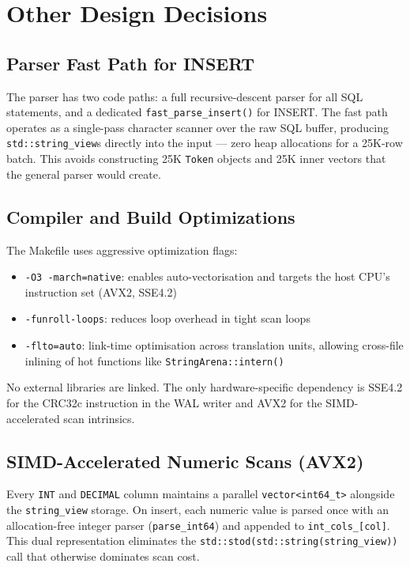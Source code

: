 \documentclass[12pt,a4paper]{article}
\begin{document}
\section{Other Design Decisions}

\subsection{Parser Fast Path for INSERT}

The parser has two code paths: a full recursive-descent parser for all SQL statements,
and a dedicated \texttt{fast\_parse\_insert()} for INSERT. The fast path operates as a
single-pass character scanner over the raw SQL buffer, producing
\texttt{std::string\_view}s directly into the input --- zero heap allocations for a 25K-row
batch. This avoids constructing 25K \texttt{Token} objects and 25K inner vectors that
the general parser would create.

\subsection{Compiler and Build Optimizations}

The Makefile uses aggressive optimization flags:

\begin{itemize}[noitemsep]
  \item \texttt{-O3 -march=native}: enables auto-vectorisation and targets the host CPU's
        instruction set (AVX2, SSE4.2)
  \item \texttt{-funroll-loops}: reduces loop overhead in tight scan loops
  \item \texttt{-flto=auto}: link-time optimisation across translation units, allowing
        cross-file inlining of hot functions like \texttt{StringArena::intern()}
\end{itemize}

No external libraries are linked. The only hardware-specific dependency is SSE4.2 for the
CRC32c instruction in the WAL writer and AVX2 for the SIMD-accelerated scan intrinsics.

\subsection{SIMD-Accelerated Numeric Scans (AVX2)}

Every \texttt{INT} and \texttt{DECIMAL} column maintains a parallel \texttt{vector<int64\_t>}
alongside the \texttt{string\_view} storage. On insert, each numeric value is parsed once
with an allocation-free integer parser (\texttt{parse\_int64}) and appended to
\texttt{int\_cols\_[col]}. This dual representation eliminates the
\texttt{std::stod(std::string(string\_view))} call that otherwise dominates scan cost.
\end{document}
